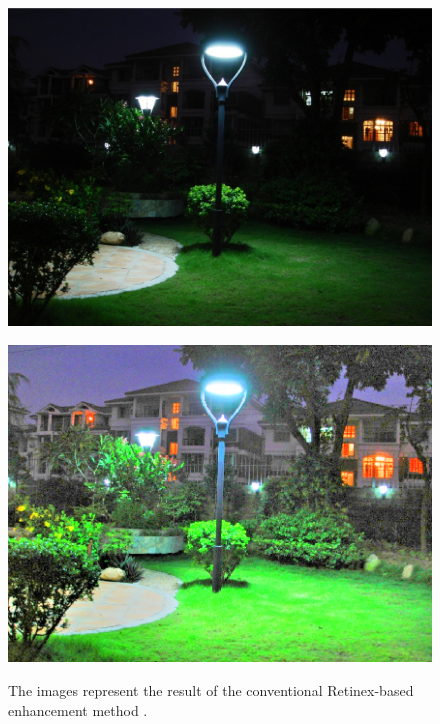 \begin{figure}[tb]
\begin{minipage}[b]{0.5\hsize}
		\centering
		\includegraphics[height=0.6\hsize]{images/msr/input.eps}
		 \label{fig:msr/input}
	\end{minipage}
	\begin{minipage}[b]{0.5\hsize}
		\centering
		\includegraphics[height=0.6\hsize]{images/msr/reflectance.eps}
		 \label{fig:msr/reflectance}
	\end{minipage}
\caption{The images represent the result of the conventional Retinex-based enhancement method \cite{msr}.}
\label{fig:msr}
\end{figure}

